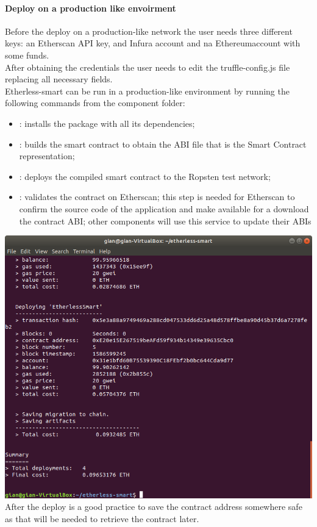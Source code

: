 \paragraph{Deploy on a production like envoirment}
Before the deploy on a production-like network the user needs three different keys: an Etherscan API
key, and Infura account and na Ethereum\glo account with some funds.\\
After obtaining the credentials the user needs to edit the truffle-config.js file replacing all necessary fields. \\
Etherless-smart can be run in a production-like environment
by running the following commands from the component folder:
\begin{itemize}
    \item {} : installs the package with all its dependencies;
    \item {}: builds the smart contract to obtain the ABI file that is the Smart Contract representation;
    \item {}: deploys the compiled smart contract to the Ropsten test network;
    \item {}: validates the contract on Etherscan; this step is needed for Etherscan to confirm the source code of the application and make available for a download the contract ABI; other components will use this service to update their ABIs\glo
\end{itemize}
\includegraphics[width=\textwidth]{res/img/deployContract.png}
After the deploy is a good practice to save the contract address somewhere safe as that will be needed to retrieve the contract later.
